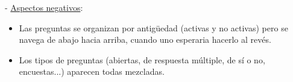  - \underline{Aspectos negativos}:

\begin{itemize}
	\item Las preguntas se organizan por antigüedad (activas y no activas) pero se navega de abajo hacia arriba, cuando uno esperaria hacerlo al revés.
	\item Los tipos de preguntas (abiertas, de respuesta múltiple, de sí o no, encuestas...) aparecen todas mezcladas.
\end{itemize}
